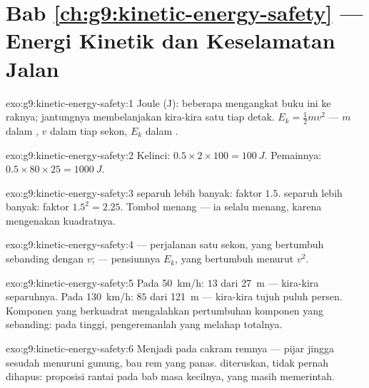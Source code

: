 \section*{Bab \ref{ch:g9:kinetic-energy-safety} --- Energi Kinetik dan Keselamatan Jalan}

\begin{solution}{exo:g9:kinetic-energy-safety:1}
Joule (\unit{J}): beberapa  mengangkat buku ini ke raknya;
jantungnya membelanjakan kira-kira satu tiap detak. $E_k = \frac12 m
v^2$ --- $m$ dalam , $v$ dalam  tiap sekon, $E_k$ dalam
.
\end{solution}

\begin{solution}{exo:g9:kinetic-energy-safety:2}
Kelinci: $0.5 \times 2 \times 100 = \qty{100}{J}$. Pemainnya: $0.5
\times 80 \times 25 = \qty{1000}{J}$.
\end{solution}

\begin{solution}{exo:g9:kinetic-energy-safety:3}
 separuh lebih banyak: faktor $1.5$.  separuh
lebih banyak: faktor $1.5^2
= 2.25$. Tombol  menang --- ia selalu menang, karena
mengenakan kuadratnya.
\end{solution}

\begin{solution}{exo:g9:kinetic-energy-safety:4}
 --- perjalanan satu sekon, yang bertumbuh sebanding
dengan $v$;  --- pensiunnya $E_k$, yang bertumbuh
menurut $v^2$.
\end{solution}

\begin{solution}{exo:g9:kinetic-energy-safety:5}
Pada \qty{50}{km/h}: $13$ dari \qty{27}{m} --- kira-kira separuhnya.
Pada \qty{130}{km/h}: $85$ dari \qty{121}{m} --- kira-kira tujuh puluh
persen. Komponen yang berkuadrat mengalahkan pertumbuhan komponen yang
sebanding: pada  tinggi, pengeremanlah yang melahap totalnya.
\end{solution}

\begin{solution}{exo:g9:kinetic-energy-safety:6}
Menjadi  pada cakram remnya --- pijar jingga sesudah menuruni
gunung, bau rem yang panas.  diteruskan, tidak pernah dihapus:
proposisi rantai pada bab  masa kecilnya, yang masih memerintah.
\end{solution}

